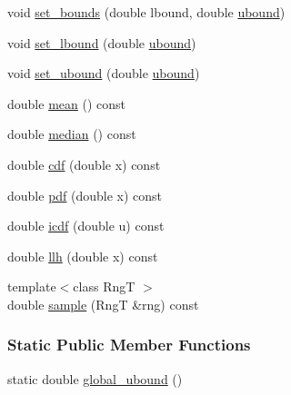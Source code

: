 \begin{DoxyCompactItemize}
\item 
void \hyperlink{classprior__hessian_1_1UpperTruncatedDist_a91569d20bfec0bd4b5404e0aef0b89df}{set\+\_\+bounds} (double lbound, double \hyperlink{classprior__hessian_1_1UpperTruncatedDist_a047a08465860a8f2aea2af28760df905}{ubound})
\item 
void \hyperlink{classprior__hessian_1_1UpperTruncatedDist_a9b3ea4f5bd030d14315d65682b01b9c4}{set\+\_\+lbound} (double \hyperlink{classprior__hessian_1_1UpperTruncatedDist_a047a08465860a8f2aea2af28760df905}{ubound})
\item 
void \hyperlink{classprior__hessian_1_1UpperTruncatedDist_aef464872d67d72ef3b7036899a5e84ba}{set\+\_\+ubound} (double \hyperlink{classprior__hessian_1_1UpperTruncatedDist_a047a08465860a8f2aea2af28760df905}{ubound})
\item 
double \hyperlink{classprior__hessian_1_1UpperTruncatedDist_a19894f8802cc4ca4a59ae5255445d4f7}{mean} () const 
\item 
double \hyperlink{classprior__hessian_1_1UpperTruncatedDist_a5cfa20262288334e9b9314960a37ccf2}{median} () const 
\item 
double \hyperlink{classprior__hessian_1_1UpperTruncatedDist_a68566f44491647190af6d25378c8961e}{cdf} (double x) const 
\item 
double \hyperlink{classprior__hessian_1_1UpperTruncatedDist_a9d5c45837741a460ac78b68be0588b99}{pdf} (double x) const 
\item 
double \hyperlink{classprior__hessian_1_1UpperTruncatedDist_ae199997b515591a11a20a469bae33754}{icdf} (double u) const 
\item 
double \hyperlink{classprior__hessian_1_1UpperTruncatedDist_ab9779a1bcedc7f1218bbf8f5f89574db}{llh} (double x) const 
\item 
{\footnotesize template$<$class RngT $>$ }\\double \hyperlink{classprior__hessian_1_1UpperTruncatedDist_a12fe6e6c4b3af523b10bc0fa79d9d7c4}{sample} (RngT \&rng) const 
\end{DoxyCompactItemize}
\subsubsection*{Static Public Member Functions}
\begin{DoxyCompactItemize}
\item 
static double \hyperlink{classprior__hessian_1_1UpperTruncatedDist_a648dfc2c62b958ef82bd231ef74ac4d8}{global\+\_\+ubound} ()
\end{DoxyCompactItemize}


